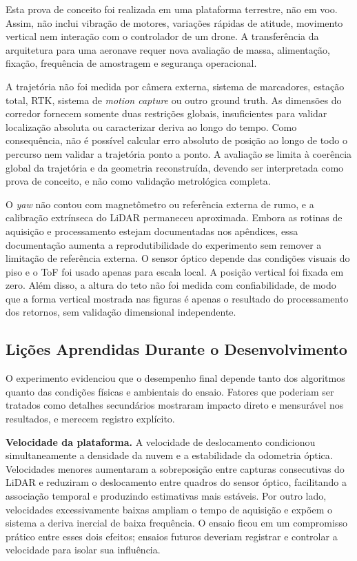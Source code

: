 Esta prova de conceito foi realizada em uma plataforma terrestre, não em voo. Assim, não inclui vibração de motores, variações rápidas de atitude, movimento vertical nem interação com o controlador de um drone. A transferência da arquitetura para uma aeronave requer nova avaliação de massa, alimentação, fixação, frequência de amostragem e segurança operacional.

A trajetória não foi medida por câmera externa, sistema de marcadores, estação total, RTK, sistema de \textit{motion capture} ou outro ground truth. As dimensões do corredor fornecem somente duas restrições globais, insuficientes para validar localização absoluta ou caracterizar deriva ao longo do tempo. Como consequência, não é possível calcular erro absoluto de posição ao longo de todo o percurso nem validar a trajetória ponto a ponto. A avaliação se limita à coerência global da trajetória e da geometria reconstruída, devendo ser interpretada como prova de conceito, e não como validação metrológica completa.

O \textit{yaw} não contou com magnetômetro ou referência externa de rumo, e a calibração extrínseca do LiDAR permaneceu aproximada. Embora as rotinas de aquisição e processamento estejam documentadas nos apêndices, essa documentação aumenta a reprodutibilidade do experimento sem remover a limitação de referência externa. O sensor óptico depende das condições visuais do piso e o ToF foi usado apenas para escala local. A posição vertical foi fixada em zero. Além disso, a altura do teto não foi medida com confiabilidade, de modo que a forma vertical mostrada nas figuras é apenas o resultado do processamento dos retornos, sem validação dimensional independente.


\subsection{Lições Aprendidas Durante o Desenvolvimento}

O experimento evidenciou que o desempenho final depende tanto dos algoritmos
quanto das condições físicas e ambientais do ensaio. Fatores que poderiam ser
tratados como detalhes secundários mostraram impacto direto e mensurável nos
resultados, e merecem registro explícito.

\textbf{Velocidade da plataforma.} A velocidade de deslocamento condicionou
simultaneamente a densidade da nuvem e a estabilidade da odometria óptica.
Velocidades menores aumentaram a sobreposição entre capturas consecutivas do
LiDAR e reduziram o deslocamento entre quadros do sensor óptico, facilitando
a associação temporal e produzindo estimativas mais estáveis. Por outro lado,
velocidades excessivamente baixas ampliam o tempo de aquisição e expõem o
sistema a deriva inercial de baixa frequência. O ensaio ficou em um
compromisso prático entre esses dois efeitos; ensaios futuros deveriam
registrar e controlar a velocidade para isolar sua influência.

